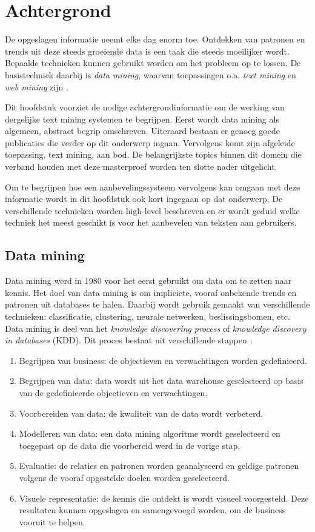 \chapter{Achtergrond}\label{hs:achtergrond}

De opgeslagen informatie neemt elke dag enorm toe. Ontdekken van patronen en trends uit deze steeds groeiende data is een taak die steeds moeilijker wordt. Bepaalde technieken kunnen gebruikt worden om het probleem op te lossen. De basistechniek daarbij is \textit{data mining}, waarvan toepassingen o.a. \textit{text mining} en \textit{web mining} zijn \cite{Nasa2012}. 

Dit hoofdstuk voorziet de nodige achtergrondinformatie om de werking van dergelijke text mining systemen te begrijpen. Eerst wordt data mining als algemeen, abstract begrip omschreven. Uiteraard bestaan er genoeg goede publicaties die verder op dit onderwerp ingaan. Vervolgens komt zijn afgeleide toepassing, text mining, aan bod. De belangrijkste topics binnen dit domein die verband houden met deze masterproef worden ten slotte nader uitgelicht. 

Om te begrijpen hoe een aanbevelingssysteem vervolgens kan omgaan met deze informatie wordt in dit hoofdstuk ook kort ingegaan op dat onderwerp. De verschillende technieken worden high-level beschreven en er wordt geduid welke techniek het meest geschikt is voor het aanbevelen van teksten aan gebruikers. 

\section{Data mining}\label{data-mining}
Data mining werd in 1980 voor het eerst gebruikt om data om te zetten naar kennis. Het doel van data mining is om impliciete, vooraf onbekende trends en patronen uit databases te halen. Daarbij wordt gebruik gemaakt van verschillende technieken: classificatie, clustering, neurale netwerken, beslissingsbomen, etc. 
\\Data mining is deel van het \textit{knowledge discovering process} of \textit{knowledge discovery in databases} (KDD). Dit proces bestaat uit verschillende stappen \cite{Fayyad1996}:
\begin{enumerate}
	\item Begrijpen van business: de objectieven en verwachtingen worden gedefinieerd.
	\item Begrijpen van data: data wordt uit het data warehouse geselecteerd op basis van de gedefinieerde objectieven en verwachtingen.
	\item Voorbereiden van data: de kwaliteit van de data wordt verbeterd.
	\item Modelleren van data: een data mining algoritme wordt geselecteerd en toegepast op de data die voorbereid werd in de vorige stap.
	\item Evaluatie: de relaties en patronen worden geanalyseerd en geldige patronen volgens de vooraf opgestelde doelen worden geselecteerd.
	\item Visuele representatie: de kennis die ontdekt is wordt visueel voorgesteld. Deze resultaten kunnen opgeslagen en samengevoegd worden, om de business vooruit te helpen.
\end{enumerate}


